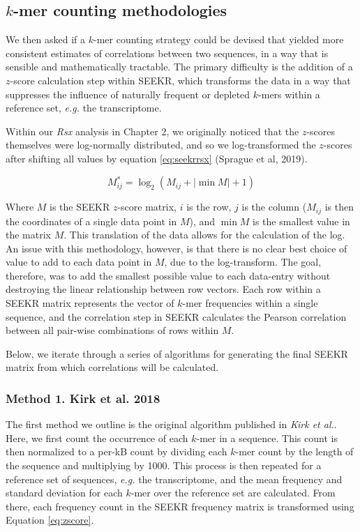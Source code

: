 \subsection{$k$-mer counting methodologies}

We then asked if a $k$-mer counting strategy could be devised that yielded more consistent estimates of correlations between two sequences, in a way that is sensible and mathematically tractable. The primary difficulty is the addition of a $z$-score calculation step within SEEKR, which transforms the data in a way that suppresses the influence of naturally frequent or depleted $k$-mers within a reference set, \emph{e.g.} the transcriptome. 

Within our \emph{Rsx} analysis in Chapter 2, we originally noticed that the $z$-scores themselves were log-normally distributed, and so we log-transformed the $z$-scores after shifting all values by equation \ref{eq:seekrrsx} (Sprague et al, 2019).

\begin{equation}
M_{ij}^* = \log_2{\left(M_{ij} + |\min{M}|+1\right)}
\label{eq:seekrrsx}
\end{equation}


Where $M$ is the SEEKR $z$-score matrix, $i$ is the row, $j$ is the column ($M_{ij}$ is then the coordinates of a single data point in $M$), and $\min{M}$ is the smallest value in the matrix $M$. This translation of the data allows for the calculation of the log. An issue with this methodology, however, is that there is no clear best choice of value to add to each data point in $M$, due to the log-transform. The goal, therefore, was to add the smallest possible value to each data-entry without destroying the linear relationship between row vectors. Each row within a SEEKR matrix represents the vector of $k$-mer frequencies within a single sequence, and the correlation step in SEEKR calculates the Pearson correlation between all pair-wise combinations of rows within $M$.

Below, we iterate through a series of algorithms for generating the final SEEKR matrix from which correlations will be calculated. 

\subsubsection{Method 1. Kirk et al. 2018}

The first method we outline is the original algorithm published in \emph{Kirk et al.}. Here, we first count the occurrence of each $k$-mer in a sequence. This count is then normalized to a per-kB count by dividing each $k$-mer count by the length of the sequence and multiplying by 1000. This process is then repeated for a reference set of sequences, \emph{e.g.} the transcriptome, and the mean frequency and standard deviation for each $k$-mer over the reference set are calculated. From there, each frequency count in the SEEKR frequency matrix is transformed using Equation \ref{eq:zscore}. 

